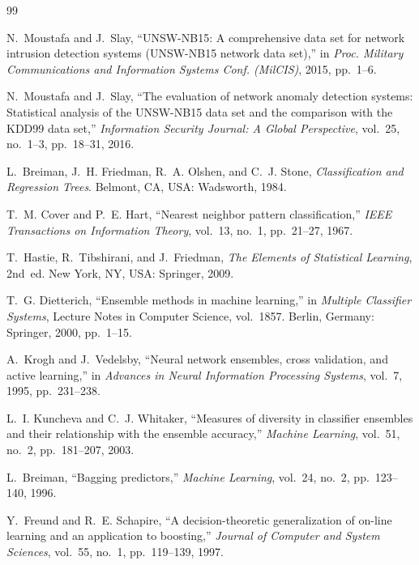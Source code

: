 \documentclass[conference,10pt]{IEEEtran}
\begin{document}
\begin{thebibliography}{99}

N.~Moustafa and J.~Slay, ``UNSW-NB15: A comprehensive data set for network intrusion detection systems (UNSW-NB15 network data set),'' in \emph{Proc. Military Communications and Information Systems Conf. (MilCIS)}, 2015, pp.~1--6.

N.~Moustafa and J.~Slay, ``The evaluation of network anomaly detection systems: Statistical analysis of the UNSW-NB15 data set and the comparison with the KDD99 data set,'' \emph{Information Security Journal: A Global Perspective}, vol.~25, no.~1--3, pp.~18--31, 2016.

L.~Breiman, J.~H. Friedman, R.~A. Olshen, and C.~J. Stone, \emph{Classification and Regression Trees}. Belmont, CA, USA: Wadsworth, 1984.

T.~M. Cover and P.~E. Hart, ``Nearest neighbor pattern classification,'' \emph{IEEE Transactions on Information Theory}, vol.~13, no.~1, pp.~21--27, 1967.

T.~Hastie, R.~Tibshirani, and J.~Friedman, \emph{The Elements of Statistical Learning}, 2nd~ed. New York, NY, USA: Springer, 2009.

T.~G. Dietterich, ``Ensemble methods in machine learning,'' in \emph{Multiple Classifier Systems}, Lecture Notes in Computer Science, vol.~1857. Berlin, Germany: Springer, 2000, pp.~1--15.

A.~Krogh and J.~Vedelsby, ``Neural network ensembles, cross validation, and active learning,'' in \emph{Advances in Neural Information Processing Systems}, vol.~7, 1995, pp.~231--238.

L.~I. Kuncheva and C.~J. Whitaker, ``Measures of diversity in classifier ensembles and their relationship with the ensemble accuracy,'' \emph{Machine Learning}, vol.~51, no.~2, pp.~181--207, 2003.

L.~Breiman, ``Bagging predictors,'' \emph{Machine Learning}, vol.~24, no.~2, pp.~123--140, 1996.

Y.~Freund and R.~E. Schapire, ``A decision-theoretic generalization of on-line learning and an application to boosting,'' \emph{Journal of Computer and System Sciences}, vol.~55, no.~1, pp.~119--139, 1997.


\end{thebibliography}
\end{document}
